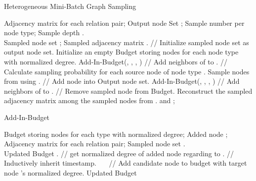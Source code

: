 \documentclass[sigconf]{acmart}
\theoremstyle{definition}
\begin{document}
\begin{algorithm}[tb] 
\caption{Heterogeneous Mini-Batch Graph Sampling} 
\label{alg:sample} 
\begin{algorithmic}[1] 
\REQUIRE
Adjacency matrix  for each  relation pair; Output node Set ; Sample number  per node type; Sample depth .\\
\ENSURE
Sampled node set ; Sampled adjacency matrix .
\STATE   // Initialize sampled node set as output node set.
\STATE  Initialize an empty Budget  storing nodes for each node type with normalized degree. 
\FOR {}
    \STATE  Add-In-Budget(, , , ) // Add neighbors of  to .
\ENDFOR
{}
            \STATE   // Calculate sampling probability for each source node  of node type . \label{line:prob}
        \ENDFOR
        \STATE  Sample  nodes  from  using .
        \FOR {} \label{line:samp}
            \STATE   // Add node  into Output node set.
            \STATE  Add-In-Budget(, , , ) // Add neighbors of  to .
            \STATE   // Remove sampled node  from Budget. \label{line:end}
        \ENDFOR
    \ENDFOR
\ENDFOR
\STATE  Reconstruct the sampled adjacency matrix  among the sampled nodes  from .
\RETURN  and ; 
\end{algorithmic} 
\end{algorithm}



\begin{algorithm}[tb] 
\caption{Add-In-Budget} 
\label{alg:budget} 
\begin{algorithmic}[1] 
\REQUIRE
Budget  storing nodes for each type with normalized degree; Added node ; Adjacency matrix  for each  relation pair; Sampled node set .\\
\ENSURE
Updated Budget .
\STATE   // get normalized degree of added node  regarding to .
             \label{line:check}
                     \STATE   // Inductively inherit timestamp. \label{line:time}
                 \ENDIF
                \STATE  \ \ \ // Add candidate node  to budget  with target node 's normalized degree. \label{line:update}
            \ENDIF
        \ENDFOR  
    \ENDFOR
\RETURN Updated Budget 
\end{algorithmic} 
\end{algorithm}



 
\end{document}
